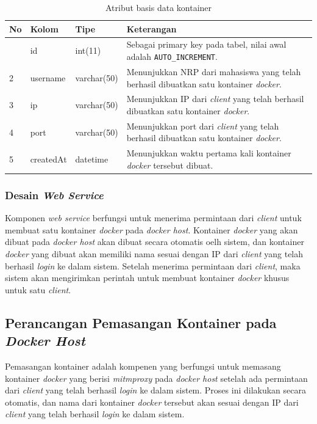 	\begin{longtable}{|p{}|p{}|p{}|p{}|}
		\caption{Atribut basis data kontainer} \label{tabelkontainer} \\
		\hline
		\textbf{No} & \textbf{Kolom} & \textbf{Tipe} & \textbf{Keterangan} \\ \hline
		\endhead
		\endfoot
		\endlastfoot
		1 & id & int(11) & Sebagai primary key pada tabel, nilai awal adalah \texttt{AUTO\_INCREMENT}. \\ \hline
		2 & username & varchar(50) & Menunjukkan NRP dari mahasiswa yang telah berhasil dibuatkan satu kontainer \textit{docker}. \\ \hline
		3 & ip & varchar(50) & Menunjukkan IP dari \textit{client} yang telah berhasil dibuatkan satu kontainer \textit{docker}. \\ \hline
		4 & port & varchar(50) & Menunjukkan port dari \textit{client} yang telah berhasil dibuatkan satu kontainer \textit{docker}. \\ \hline
		5 & createdAt & datetime & Menunjukkan waktu pertama kali kontainer \textit{docker} tersebut dibuat. \\ \hline
		
	\end{longtable}
	
	
	\subsubsection{Desain \textit{Web Service}}
	Komponen \textit{web service} berfungsi untuk menerima permintaan dari \textit{client} untuk membuat satu kontainer \textit{docker} pada \textit{docker host}. Kontainer \textit{docker} yang akan dibuat pada \textit{docker host} akan dibuat secara otomatis oelh sistem, dan kontainer \textit{docker} yang dibuat akan memiliki nama sesuai dengan IP dari \textit{client} yang telah berhasil \textit{login} ke dalam sistem. Setelah menerima permintaan dari \textit{client}, maka sistem akan mengirimkan perintah untuk membuat kontainer \textit{docker} khusus untuk satu \textit{client}. 
   	
    \subsection{Perancangan Pemasangan Kontainer pada \textit{Docker Host}}
	Pemasangan kontainer adalah kompenen yang berfungsi untuk memasang kontainer \textit{docker} yang berisi \textit{mitmproxy} pada \textit{docker host} setelah ada permintaan dari \textit{client} yang telah berhasil \textit{login} ke dalam sistem. Proses ini dilakukan secara otomatis, dan nama dari kontainer \textit{docker} tersebut akan sesuai dengan IP dari \textit{client} yang telah berhasil \textit{login} ke dalam sistem.
	
